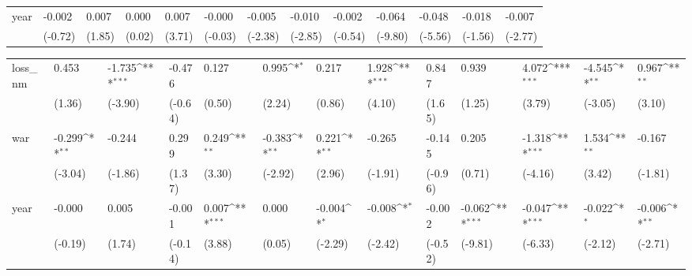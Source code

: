 \begin{tabular}{p{1.5cm} p{1.7cm} p{1.7cm} p{1.7cm} p{1.7cm} p{1.7cm} p{1.7cm} p{1.7cm} p{1.7cm} p{1.7cm} p{1.7cm} p{1.7cm} p{1.7cm}}
year            &   -0.002         &    0.007         &    0.000         &    0.007\sym{***}&   -0.000         &   -0.005\sym{*}  &   -0.010\sym{**} &   -0.002         &   -0.064\sym{***}&   -0.048\sym{***}&   -0.018         &   -0.007\sym{**} \\
                &  (-0.72)         &   (1.85)         &   (0.02)         &   (3.71)         &  (-0.03)         &  (-2.38)         &  (-2.85)         &  (-0.54)         &  (-9.80)         &  (-5.56)         &  (-1.56)         &  (-2.77)         \\
\end{tabular}
\def\sym#1{\ifmmode^{#1}\else\(^{#1}\)\fi}
\begin{tabular}{p{1.5cm} p{1.7cm} p{1.7cm} p{1.7cm} p{1.7cm} p{1.7cm} p{1.7cm} p{1.7cm} p{1.7cm} p{1.7cm} p{1.7cm} p{1.7cm} p{1.7cm}}
\hline
loss\_nm         &    0.453         &   -1.735\sym{***}&   -0.476         &    0.127         &    0.995\sym{*}  &    0.217         &    1.928\sym{***}&    0.847         &    0.939         &    4.072\sym{***}&   -4.545\sym{**} &    0.967\sym{**} \\
                &   (1.36)         &  (-3.90)         &  (-0.64)         &   (0.50)         &   (2.24)         &   (0.86)         &   (4.10)         &   (1.65)         &   (1.25)         &   (3.79)         &  (-3.05)         &   (3.10)         \\
war             &   -0.299\sym{**} &   -0.244         &    0.299         &    0.249\sym{**} &   -0.383\sym{**} &    0.221\sym{**} &   -0.265         &   -0.145         &    0.205         &   -1.318\sym{***}&    1.534\sym{**} &   -0.167         \\
                &  (-3.04)         &  (-1.86)         &   (1.37)         &   (3.30)         &  (-2.92)         &   (2.96)         &  (-1.91)         &  (-0.96)         &   (0.71)         &  (-4.16)         &   (3.42)         &  (-1.81)         \\
year            &   -0.000         &    0.005         &   -0.001         &    0.007\sym{***}&    0.000         &   -0.004\sym{*}  &   -0.008\sym{*}  &   -0.002         &   -0.062\sym{***}&   -0.047\sym{***}&   -0.022\sym{*}  &   -0.006\sym{**} \\
                &  (-0.19)         &   (1.74)         &  (-0.14)         &   (3.88)         &   (0.05)         &  (-2.29)         &  (-2.42)         &  (-0.52)         &  (-9.81)         &  (-6.33)         &  (-2.12)         &  (-2.71)         \\
\end{tabular}
